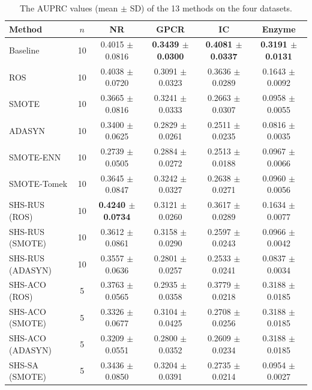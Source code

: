 \documentclass[pdflatex,sn-basic]{sn-jnl}
\begin{document}
\begin{appendices}
\begin{table}[htbp]
\centering
\caption{The AUPRC values (mean $\pm$ SD) of the 13 methods on the four datasets.}
\label{tab:sauprc}
\setlength{\tabcolsep}{3pt}%
\footnotesize
\begin{tabular}{lccccc}
\toprule
Method & $n$ & NR & GPCR & IC & Enzyme \\
\midrule
Baseline & 10 & 0.4015 $\pm$ 0.0816 & \textbf{0.3439 $\pm$ 0.0300} & \textbf{0.4081 $\pm$ 0.0337} & \textbf{0.3191 $\pm$ 0.0131} \\
ROS & 10 & 0.4038 $\pm$ 0.0720 & 0.3091 $\pm$ 0.0323 & 0.3636 $\pm$ 0.0289 & 0.1643 $\pm$ 0.0092 \\
SMOTE & 10 & 0.3665 $\pm$ 0.0816 & 0.3241 $\pm$ 0.0333 & 0.2663 $\pm$ 0.0307 & 0.0958 $\pm$ 0.0055 \\
ADASYN & 10 & 0.3400 $\pm$ 0.0625 & 0.2829 $\pm$ 0.0261 & 0.2511 $\pm$ 0.0235 & 0.0816 $\pm$ 0.0035 \\
SMOTE-ENN & 10 & 0.2739 $\pm$ 0.0505 & 0.2884 $\pm$ 0.0272 & 0.2513 $\pm$ 0.0188 & 0.0967 $\pm$ 0.0066 \\
SMOTE-Tomek & 10 & 0.3645 $\pm$ 0.0847 & 0.3242 $\pm$ 0.0327 & 0.2638 $\pm$ 0.0271 & 0.0960 $\pm$ 0.0056 \\
SHS-RUS (ROS) & 10 & \textbf{0.4240 $\pm$ 0.0734} & 0.3121 $\pm$ 0.0260 & 0.3617 $\pm$ 0.0289 & 0.1634 $\pm$ 0.0077 \\
SHS-RUS (SMOTE) & 10 & 0.3612 $\pm$ 0.0861 & 0.3158 $\pm$ 0.0290 & 0.2597 $\pm$ 0.0243 & 0.0966 $\pm$ 0.0042 \\
SHS-RUS (ADASYN) & 10 & 0.3557 $\pm$ 0.0636 & 0.2801 $\pm$ 0.0257 & 0.2533 $\pm$ 0.0241 & 0.0837 $\pm$ 0.0034 \\
SHS-ACO (ROS) & 5 & 0.3763 $\pm$ 0.0565 & 0.2935 $\pm$ 0.0358 & 0.3779 $\pm$ 0.0218 & 0.3188 $\pm$ 0.0185 \\
SHS-ACO (SMOTE) & 5 & 0.3326 $\pm$ 0.0677 & 0.3104 $\pm$ 0.0425 & 0.2708 $\pm$ 0.0256 & 0.3188 $\pm$ 0.0185 \\
SHS-ACO (ADASYN) & 5 & 0.3209 $\pm$ 0.0551 & 0.2800 $\pm$ 0.0352 & 0.2609 $\pm$ 0.0234 & 0.3188 $\pm$ 0.0185 \\
SHS-SA (SMOTE) & 5 & 0.3436 $\pm$ 0.0850 & 0.3204 $\pm$ 0.0391 & 0.2735 $\pm$ 0.0214 & 0.0954 $\pm$ 0.0027 \\
\bottomrule
\end{tabular}
\end{table}

\end{appendices}


\end{document}
